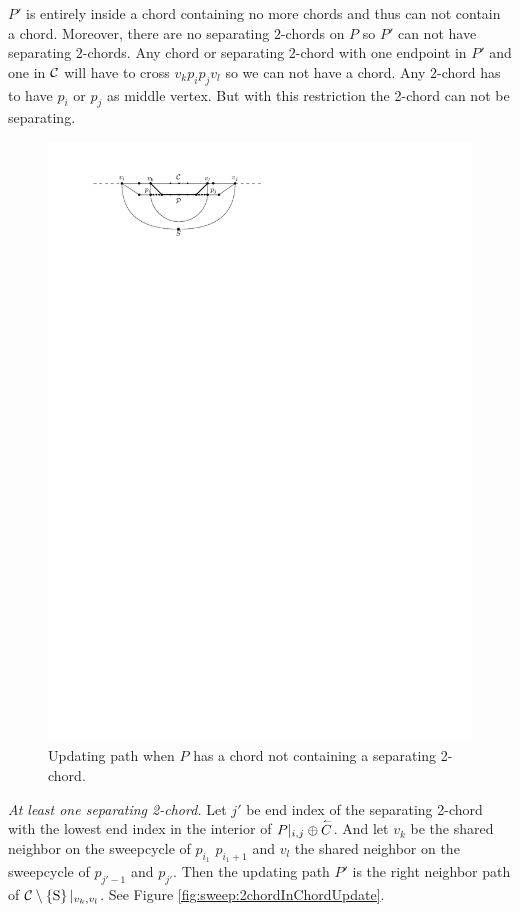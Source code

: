     $P'$ is entirely inside a chord containing no more chords and thus can not contain a chord. Moreover, there are no separating $2$-chords on $P$ so $P'$ can not have separating $2$-chords. Any chord or separating $2$-chord with one endpoint in $P'$ and one in $\mathcal{C}$ will have to cross $v_k p_i p_j v_l$ so we can not have a chord. Any 2-chord has to have $p_i$ or $p_j$ as middle vertex. But with this restriction the 2-chord can not be separating.

    \begin{figure}[h]
      \centering
      \includegraphics[scale=1]{unifiedAlgo/img/sweep/chordUpdate}
      \caption{Updating path when $P$ has a chord not containing a separating 2-chord.}
      \label{fig:sweep:chordUpdate}
    \end{figure}

    \emph{At least one separating 2-chord.}
      Let $j'$ be end index of the separating 2-chord with the lowest end index in the interior of $P|_{i, j} \oplus \accentset{\leftharpoonup}{{C}}$. And let $v_k$ be the shared neighbor on the sweepcycle of $p_{i_1}$ $p_{i_1 +1}$ and $v_l$ the shared neighbor on the sweepcycle  of $p_{j' -1}$ and $p_{j'}$.
      Then the updating path $P'$ is the right neighbor path of $\mathcal{C} \setminus \left\lbrace {\mathrm{S}} \right\rbrace|_{v_k, v_l}$. See Figure \ref{fig:sweep:2chordInChordUpdate}.

